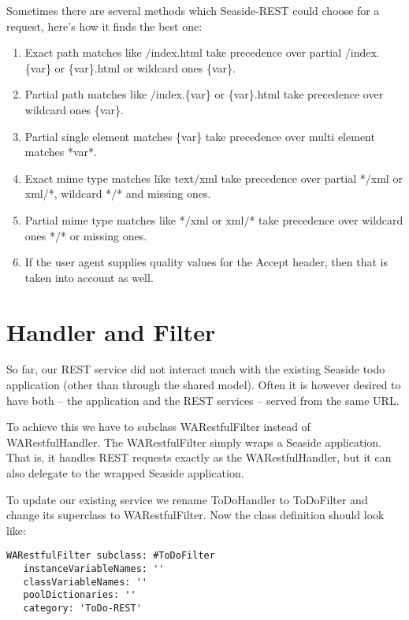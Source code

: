 \documentclass[a4paper,10pt,twoside]{book}
\newcommand{\ct}[1]{{\small\ttfamily\textup{#1}}}
\begin{document}
Sometimes there are several methods which Seaside-REST could choose for a request, here's how it finds the best one:

\begin{enumerate}
\item  Exact path matches like \ct{$/$index.html} take precedence over partial \ct{$/$index.\{var\}} or \ct{\{var\}.html} or wildcard ones \ct{\{var\}}.
\item  Partial path matches like \ct{$/$index.\{var\}} or \ct{\{var\}.html} take precedence over wildcard ones \ct{\{var\}}.
\item  Partial single element matches \ct{\{var\}} take precedence over multi element matches \ct{*var*}.
\item  Exact mime type matches like \ct{text$/$xml} take precedence over partial \ct{*$/$xml} or \ct{xml$/$*}, wildcard \ct{*$/$*} and missing ones.
\item  Partial mime type matches like \ct{*$/$xml} or \ct{xml$/$*} take precedence over wildcard ones \ct{*$/$*} or missing ones.
\item  If the user agent supplies quality values for the Accept header, then that is taken into account as well.
\end{enumerate}

\section{Handler and Filter}
\label{book:advanced:restful:handlerfilter}

So far, our REST service did not interact much with the existing Seaside todo application (other than through the shared model). Often it is however desired to have both -- the application and the REST services -- served from the same URL.

 To achieve this we have to subclass \ct{WARestfulFilter} instead of \ct{WARestfulHandler}. The \ct{WARestfulFilter} simply wraps a Seaside application. That is, it handles REST requests exactly as the \ct{WARestfulHandler}, but it can also delegate to the wrapped Seaside application.

To update our existing service we rename \ct{ToDoHandler} to \ct{ToDoFilter} and change its superclass to \ct{WARestfulFilter}. Now the class definition should look like:

\begin{lstlisting}
WARestfulFilter subclass: #ToDoFilter
   instanceVariableNames: ''
   classVariableNames: ''
   poolDictionaries: ''
   category: 'ToDo-REST'
\end{lstlisting}
\end{document}
